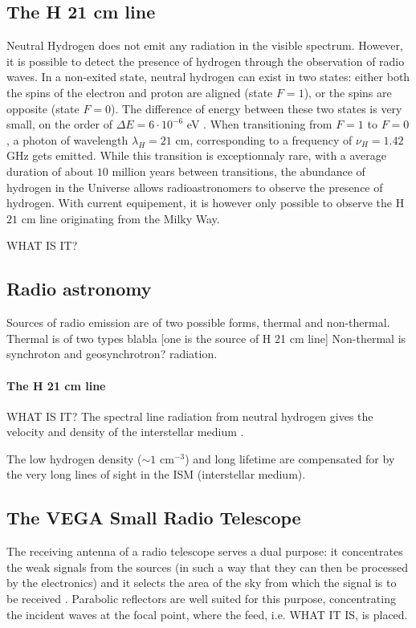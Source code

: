 \subsection{The H 21 cm line}
Neutral Hydrogen does not emit any radiation in the visible spectrum. However, it is possible to detect the presence of hydrogen through the observation of radio waves. In a non-exited state, neutral hydrogen can exist in two states: either both the spins of the electron and proton are aligned (state $F=1$), or the spins are opposite (state $F=0$). The difference of energy between these two states is very small, on the order of $\Delta E = 6 \cdot 10^{-6}$ \si{\electronvolt} \cite{frederic_courbin_introduction_nodate}. When transitioning from $F=1$ to $F=0$, a photon of wavelength $\lambda_H = 21$ cm, corresponding to a frequency of $\nu_H = 1.42$ GHz gets emitted. While this transition is exceptionnaly rare, with a average duration of about $10$ million years between transitions, the abundance of hydrogen in the Universe allows radioastronomers to observe the presence of hydrogen. With current equipement, it is however only possible to observe the H$21$ cm line originating from the Milky Way.

WHAT IS IT?

\subsection{Radio astronomy }
Sources of radio emission are of two possible forms, thermal and non-thermal.
Thermal is of two types blabla [one is the source of H 21 cm line]
Non-thermal is synchroton and geosynchrotron? radiation.

\paragraph{The H 21 cm line}
WHAT IS IT?
The spectral line radiation from neutral hydrogen gives the velocity and density of the interstellar medium \cite{burke_introduction_2013}.

The low hydrogen density ($\sim 1$ cm$^{-3}$) and long lifetime are compensated for by the very long lines of sight in the ISM (interstellar medium)\cite{burke_introduction_2013}.

\subsection{The VEGA Small Radio Telescope}

The receiving antenna of a radio telescope serves a dual purpose: it concentrates the weak signals from the sources (in such a way that they can then be processed by the electronics) and it selects the area of the sky from which the signal is to be received \cite{lauterbach_radio_2022}.
Parabolic reflectors are well suited for this purpose, concentrating the incident waves at the focal point, where the feed, i.e. WHAT IT IS, is placed.

